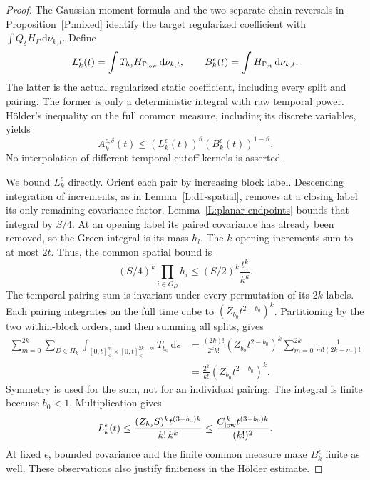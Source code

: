 \documentclass[12pt]{article}
\numberwithin{equation}{section}
\theoremstyle{definition}
\newcommand{\ud}{\,\mathrm{d}}
\begin{document}
\begin{proof}
  The Gaussian moment formula and the two separate chain reversals in
  Proposition~\ref{P:mixed} identify the target regularized coefficient
  with $\int Q_\delta H_\Gamma\ud\nu_{k,t}$. Define
  \[
    L_k^\epsilon(t)=\int T_{b_0}H_{\Gamma_{\rm low}}\ud\nu_{k,t},
    \qquad
    B_k^\epsilon(t)=\int H_{\Gamma_{\rm st}}\ud\nu_{k,t}.
  \]
  The latter is the actual regularized static coefficient, including
  every split and pairing. The former is only a deterministic integral
  with raw temporal power. H\"older's inequality on the full common
  measure, including its discrete variables, yields
  \begin{equation}\label{E:planar-coefficient-holder}
    A_k^{\epsilon,\delta}(t)
    \le\left(L_k^\epsilon(t)\right)^\vartheta
    \left(B_k^\epsilon(t)\right)^{1-\vartheta}.
  \end{equation}
  No interpolation of different temporal cutoff kernels is asserted.

  We bound $L_k^\epsilon$ directly. Orient each pair by increasing block
  label. Descending integration of increments, as in
  Lemma~\ref{L:d1-spatial}, removes at a closing label its only remaining
  covariance factor. Lemma~\ref{L:planar-endpoints} bounds that integral
  by $S/4$. At an opening label its paired covariance has already been
  removed, so the Green integral is its mass $h_l$. The $k$ opening
  increments sum to at most $2t$. Thus, the common spatial bound is
  \[
    (S/4)^k\prod_{i\in O_D}h_i
    \le(S/2)^k\frac{t^k}{k^k}.
  \]
  The temporal pairing sum is invariant under every permutation of its
  $2k$ labels. Each pairing integrates on the full time cube to
  $(Z_{b_0}t^{2-b_0})^k$. Partitioning by the two within-block orders,
  and then summing all splits, gives
  \[
    \begin{split}
      \sum_{m=0}^{2k}\sum_{D\in\Pi_k}
      \int_{[0,t]^m_<\times[0,t]^{2k-m}_<}T_{b_0}\ud s
      &=\frac{(2k)!}{2^kk!}(Z_{b_0}t^{2-b_0})^k
      \sum_{m=0}^{2k}\frac1{m!(2k-m)!}\\
      &=\frac{2^k}{k!}(Z_{b_0}t^{2-b_0})^k.
    \end{split}
  \]
  Symmetry is used for the sum, not for an individual pairing. The
  integral is finite because $b_0<1$. Multiplication gives
  \begin{equation}\label{E:planar-low-coefficient}
    L_k^\epsilon(t)
    \le\frac{(Z_{b_0}S)^kt^{(3-b_0)k}}{k!\,k^k}
    \le\frac{C_{\rm low}^{\,k}t^{(3-b_0)k}}{(k!)^2}.
  \end{equation}
  At fixed $\epsilon$, bounded covariance and the finite common measure
  make $B_k^\epsilon$ finite as well. These observations also justify
  finiteness in the H\"older estimate.


\end{proof}
\end{document}

